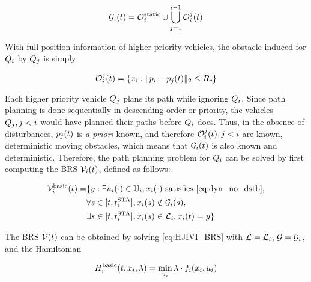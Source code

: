 \begin{equation}
\label{eq:obsseti}
\obsset_i(t)  = \soset_i \cup \bigcup_{j=1}^{i-1} \ioset_i^j(t)
\end{equation}

With full position information of higher priority vehicles, the obstacle induced for $Q_i$ by $Q_j$ is simply

\begin{equation}
\label{eq:ioset}
\ioset_i^j(t) = \{\state_i: \|\pos_i - \pos_j(t)\|_2 \le \rc \}
\end{equation}

Each higher priority vehicle $Q_j$ plans its path while ignoring $Q_i$. Since path planning is done sequentially in descending order or priority, the vehicles $Q_j, j<i$ would have planned their paths before $Q_i$ does. Thus, in the absence of disturbances, $p_j(t)$ is \textit{a priori} known, and therefore $\mathcal{O}_i^j(t), j<i$ are known, deterministic moving obstacles, which means that $\mathcal{G}_i(t)$ is also known and deterministic. Therefore, the path planning problem for $Q_i$ can be solved by first computing the BRS $\mathcal{V}_i(t)$, defined as follows:

\begin{equation}
\label{eq:BRS_basic}
\begin{aligned}
\brs_i^\text{basic}(t) = & \{y: \exists \ctrl_i(\cdot) \in \cfset_i, \state_i(\cdot) \text{ satisfies \eqref{eq:dyn_no_dstb}}, \\
& \forall s \in [t, \sta_i],\state_i(s) \notin \obsset_i(s), \\
& \exists s \in [t, \sta_i], \state_i(s) \in \targetset_i, \state_i(t) = y\}
\end{aligned}
\end{equation}

The BRS $\mathcal{V}(t)$ can be obtained by solving \eqref{eq:HJIVI_BRS} with $\mathcal{L} = \mathcal{L}_i$, $\mathcal{G} = \mathcal{G}_i$, and the Hamiltonian 

\begin{equation}
\label{eq:basicham}
\ham_i^\text{basic}(t, \state_i, \costate) = \min_{\ctrl_i} \costate \cdot \fdyn_i(\state_i, \ctrl_i)
\end{equation}

